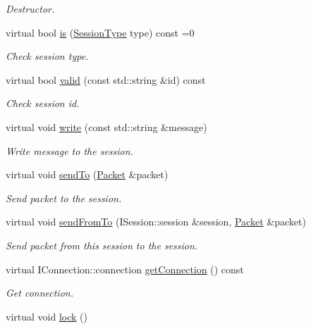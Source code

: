 \begin{DoxyCompactItemize}
\begin{DoxyCompactList}\small\item\em Destructor. \end{DoxyCompactList}\item 
virtual bool \hyperlink{class_session_afdebd34ba244081dcc22e8071bdb1578}{is} (\hyperlink{class_i_session_a7989a93d03d8345d213a021d7444a32f}{Session\-Type} type) const =0
\begin{DoxyCompactList}\small\item\em Check session type. \end{DoxyCompactList}\item 
virtual bool \hyperlink{class_session_ae54e71dd24a2308a8fdc5d2f6c9cf12f}{valid} (const std\-::string \&id) const 
\begin{DoxyCompactList}\small\item\em Check session id. \end{DoxyCompactList}\item 
virtual void \hyperlink{class_session_ace8f448f15e36a0b625cbaccfdf0d58e}{write} (const std\-::string \&message)
\begin{DoxyCompactList}\small\item\em Write message to the session. \end{DoxyCompactList}\item 
virtual void \hyperlink{class_session_ada59014b2b13ccaf9fdf0df0e7db0f9a}{send\-To} (\hyperlink{class_packet}{Packet} \&packet)
\begin{DoxyCompactList}\small\item\em Send packet to the session. \end{DoxyCompactList}\item 
virtual void \hyperlink{class_session_a8f1eb68903407f30d56113ed9aa462b6}{send\-From\-To} (I\-Session\-::session \&session, \hyperlink{class_packet}{Packet} \&packet)
\begin{DoxyCompactList}\small\item\em Send packet from this session to the session. \end{DoxyCompactList}\item 
virtual I\-Connection\-::connection \hyperlink{class_session_a9b7f14384a328100d8e20c8502ce700b}{get\-Connection} () const 
\begin{DoxyCompactList}\small\item\em Get connection. \end{DoxyCompactList}\item 
\hypertarget{class_session_ae728b93b2a5e79feaca2687795ad37f9}{virtual void \hyperlink{class_session_ae728b93b2a5e79feaca2687795ad37f9}{lock} ()}\label{class_session_ae728b93b2a5e79feaca2687795ad37f9}


\end{DoxyCompactItemize}
